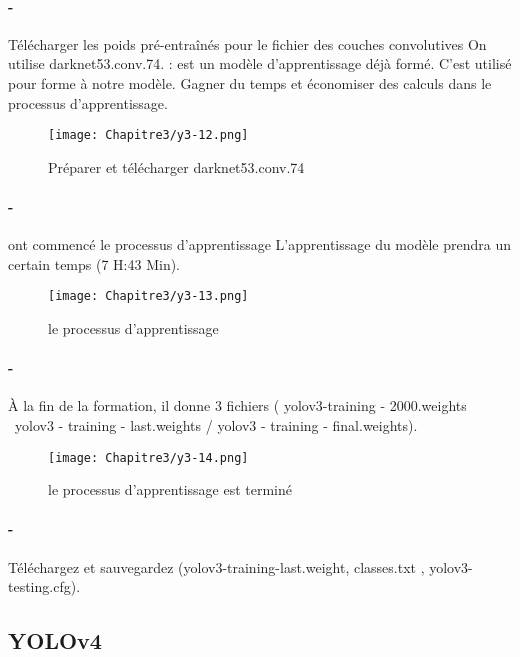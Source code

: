       \paragraph{-} Télécharger les poids pré-entraînés pour le fichier des couches convolutives On utilise darknet53.conv.74. : 
      est un  modèle d’apprentissage  déjà formé. C’est utilisé pour forme  à notre modèle.
      Gagner du temps et économiser des calculs dans le processus d'apprentissage.
      \begin{figure}[H]
           \centering
           \texttt{[image: Chapitre3/y3-12.png]}
           \caption{ Préparer et télécharger  darknet53.conv.74}
           \label{y3-12}
           \end{figure} 

      \paragraph{-} ont commencé le processus d'apprentissage
      L'apprentissage du modèle prendra un certain temps (7 H:43 Min).
      \begin{figure}[H]
            \centering
            \texttt{[image: Chapitre3/y3-13.png]}
            \caption{ le processus d'apprentissage }
            \label{y3-13}
           \end{figure} 
     
      \paragraph{-} À la fin de la formation, il donne 3 fichiers ( yolov3-training - 2000.weights \ yolov3 - training - last.weights /  yolov3 - training - final.weights).
      \begin{figure}[H]
           \centering
           \texttt{[image: Chapitre3/y3-14.png]}
           \caption{ le processus d'apprentissage est terminé}
           \label{y3-14}
           \end{figure}

      \paragraph{-} Téléchargez et sauvegardez (yolov3-training-last.weight, classes.txt , yolov3-testing.cfg).
 

     \subsection{YOLOv4}
